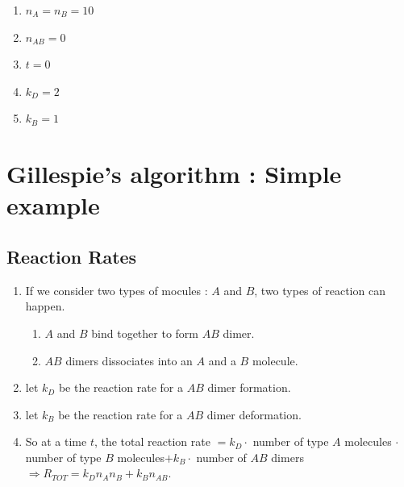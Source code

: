 \documentclass[11pt,a4paper]{article}
\begin{document}
\begin{enumerate}
  \item $n_{A} = n_{B} = 10$
  \item $n_{AB} = 0 $
  \item $t = 0$
  \item $k_{D} = 2 $
  \item $k_{B} = 1 $

\end{enumerate}

\section{Gillespie's algorithm : Simple example}

\subsection{Reaction Rates}
  \begin{enumerate}
    \item If we consider two types of mocules : $A$ and $B$, two types of reaction can happen.
    \begin{enumerate}
      \item $A$ and $B$ bind together to form $AB$ dimer.
      \item $AB$ dimers dissociates into an $A$ and a $B$ molecule.
    \end{enumerate}
    \item let $k_D$ be the reaction rate for a $AB$ dimer formation.
    \item let $k_B$ be the reaction rate for a $AB$ dimer deformation.
    \item So at a time $t$, the total reaction rate $ = k_D \cdot$ number of type $A$ molecules $\cdot$number of type $B$ molecules$ + k_B\cdot$ number of $AB$ dimers $	\Rightarrow R_{TOT} = k_{D}n_{A}n_{B} + k_{B}n_{AB}$.
  \end{enumerate}
\end{document}
